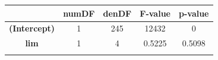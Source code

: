 \documentclass[]{article}
\begin{document}
\begin{longtable}[]{@{}ccccc@{}}
\toprule
\begin{minipage}[b]{0.21\columnwidth}\centering\strut
~
\strut\end{minipage} &
\begin{minipage}[b]{0.10\columnwidth}\centering\strut
numDF
\strut\end{minipage} &
\begin{minipage}[b]{0.10\columnwidth}\centering\strut
denDF
\strut\end{minipage} &
\begin{minipage}[b]{0.12\columnwidth}\centering\strut
F-value
\strut\end{minipage} &
\begin{minipage}[b]{0.12\columnwidth}\centering\strut
p-value
\strut\end{minipage}\tabularnewline
\midrule
\endhead
\begin{minipage}[t]{0.21\columnwidth}\centering\strut
\textbf{(Intercept)}
\strut\end{minipage} &
\begin{minipage}[t]{0.10\columnwidth}\centering\strut
1
\strut\end{minipage} &
\begin{minipage}[t]{0.10\columnwidth}\centering\strut
245
\strut\end{minipage} &
\begin{minipage}[t]{0.12\columnwidth}\centering\strut
12432
\strut\end{minipage} &
\begin{minipage}[t]{0.12\columnwidth}\centering\strut
0
\strut\end{minipage}\tabularnewline
\begin{minipage}[t]{0.21\columnwidth}\centering\strut
\textbf{lim}
\strut\end{minipage} &
\begin{minipage}[t]{0.10\columnwidth}\centering\strut
1
\strut\end{minipage} &
\begin{minipage}[t]{0.10\columnwidth}\centering\strut
4
\strut\end{minipage} &
\begin{minipage}[t]{0.12\columnwidth}\centering\strut
0.5225
\strut\end{minipage} &
\begin{minipage}[t]{0.12\columnwidth}\centering\strut
0.5098
\strut\end{minipage}\tabularnewline
\begin{minipage}[t]{0.21\columnwidth}\centering\strut

\end{minipage}
\end{longtable}
\end{document}

